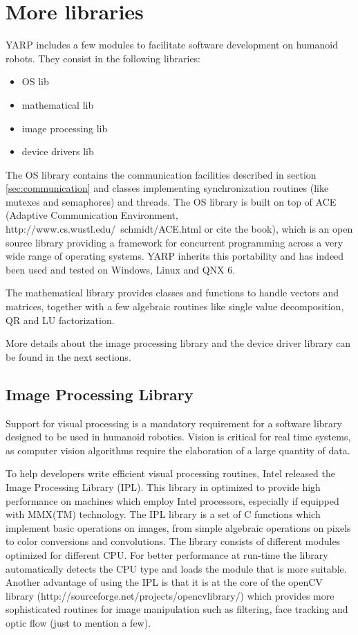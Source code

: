 \section{More libraries}
YARP includes a few modules to facilitate software development on humanoid robots. They consist in the following libraries:
\begin{itemize}
\item{OS lib}
\item{mathematical lib}
\item{image processing lib}
\item{device drivers lib}
\end{itemize}

The OS library contains the communication facilities described in section \ref{sec:communication} and classes implementing synchronization routines (like mutexes and semaphores) and threads. The OS library is built on top of ACE (Adaptive Communication Environment, http://www.cs.wustl.edu/~schmidt/ACE.html or cite the book), which is an open source library providing a framework for concurrent programming across a very wide range of operating systems. YARP inherits this portability and has indeed been used and tested on Windows, Linux and QNX 6.

The mathematical library provides classes and functions to handle vectors and matrices, together with a few algebraic routines like single value decomposition, QR and LU factorization.

More details about the image processing library and the device driver library can be found in the next sections.

\subsection{Image Processing Library}
Support for visual processing is a mandatory requirement for a software library designed to be used in humanoid robotics. Vision is critical for real time systems, as computer vision algorithms require the elaboration of a large quantity of data.

To help developers write efficient visual processing routines, Intel released the Image Processing Library (IPL). This library in optimized to provide high performance on machines which employ Intel processors, especially if equipped with MMX(TM) technology. The IPL library is a set of C functions which implement basic operations on images, from simple algebraic operations on pixels to color conversions and convolutions. The library consists of different modules optimized for different CPU. For better performance at run-time the library automatically detects the CPU type and loads the module that is more suitable. Another advantage of using the IPL is that it is at the core of the openCV library (http://sourceforge.net/projects/opencvlibrary/) which provides more sophisticated routines for image manipulation such as filtering, face tracking and optic flow (just to mention a few).

